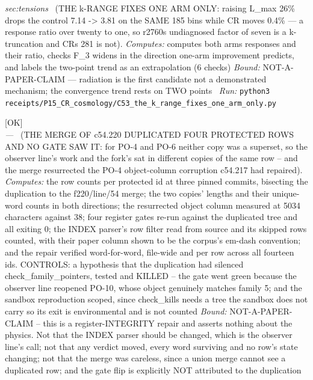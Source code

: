 \begin{description}
\textit{sec:tensions} \ (THE k-RANGE FIXES ONE ARM ONLY: raising L\_max 26\% drops the control 7.14 -> 3.81 on the SAME 185 bins while CR moves 0.4\% --- a response ratio over twenty to one, so r2760s undiagnosed factor of seven is a k-truncation and CRs 281 is not). 
\emph{Computes:} computes both arms responses and their ratio, checks F\_3 widens in the direction one-arm improvement predicts, and labels the two-point trend as an extrapolation (6 checks)
 \emph{Bound:} NOT-A-PAPER-CLAIM --- radiation is the first candidate not a demonstrated mechanism; the convergence trend rests on TWO points
\ \emph{Run:} \texttt{python3 receipts/P15\_CR\_cosmology/C53\_the\_k\_range\_fixes\_one\_arm\_only.py}
\item[\label{rcpt:M1_the_merge_of_my_own_revision_duplicated_four_protected_rows_and_no_gate_saw_it}\texttt{M1\_the\_merge\_of\_my\_own\_revision\_duplicated\_four\_protected\_rows\_and\_no\_gate\_saw\_it}]\hfill\textsf{[OK]}\\
\textit{---} \ (THE MERGE OF c54.220 DUPLICATED FOUR PROTECTED ROWS AND NO GATE SAW IT: for PO-4 and PO-6 neither copy was a superset, so the observer line's work and the fork's sat in different copies of the same row -- and the merge resurrected the PO-4 object-column corruption c54.217 had repaired). 
\emph{Computes:} the row counts per protected id at three pinned commits, bisecting the duplication to the f220/line/54 merge; the two copies' lengths and their unique-word counts in both directions; the resurrected object column measured at 5034 characters against 38; four register gates re-run against the duplicated tree and all exiting 0; the INDEX parser's row filter read from source and its skipped rows counted, with their paper column shown to be the corpus's em-dash convention; and the repair verified word-for-word, file-wide and per row across all fourteen ids. CONTROLS: a hypothesis that the duplication had silenced check\_family\_pointers, tested and KILLED -- the gate went green because the observer line reopened PO-10, whose object genuinely matches family 5; and the sandbox reproduction scoped, since check\_kills needs a tree the sandbox does not carry so its exit is environmental and is not counted
 \emph{Bound:} NOT-A-PAPER-CLAIM -- this is a register-INTEGRITY repair and asserts nothing about the physics. Not that the INDEX parser should be changed, which is the observer line's call; not that any verdict moved, every word surviving and no row's state changing; not that the merge was careless, since a union merge cannot see a duplicated row; and the gate flip is explicitly NOT attributed to the duplication

\end{description}
